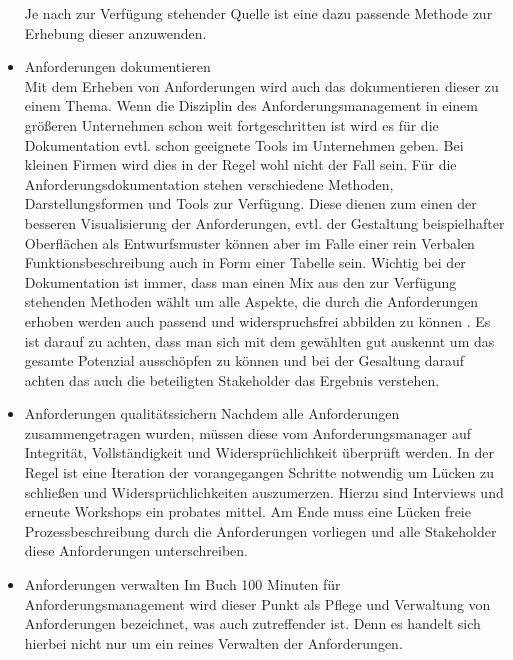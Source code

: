 \begin{itemize}
		Je nach zur Verfügung stehender Quelle ist eine dazu passende Methode zur Erhebung 
		dieser anzuwenden.
		
\item Anforderungen dokumentieren\\
		Mit dem Erheben von Anforderungen wird auch das dokumentieren dieser zu einem Thema. 
		Wenn die Disziplin des Anforderungsmanagement in einem größeren Unternehmen schon weit
		fortgeschritten ist wird es für die Dokumentation evtl. schon geeignete Tools im 
		Unternehmen geben. Bei kleinen Firmen wird dies in der Regel wohl nicht der Fall sein.
		Für die Anforderungsdokumentation stehen verschiedene Methoden, Darstellungsformen und 
		Tools zur Verfügung. Diese dienen zum einen der besseren Visualisierung der 
		Anforderungen, evtl. der Gestaltung beispielhafter Oberflächen als Entwurfsmuster 
		können aber im Falle einer rein Verbalen Funktionsbeschreibung auch in Form einer 
		Tabelle sein. Wichtig bei der Dokumentation ist immer, dass man einen Mix aus den zur 
		Verfügung stehenden Methoden wählt um alle Aspekte, die durch die Anforderungen erhoben 
		werden auch passend und widerspruchsfrei abbilden zu können
		\autocite[93-137]{AMin.sieben.T}. Es ist darauf zu achten, dass man sich mit dem gewählten 
		gut auskennt um das gesamte Potenzial ausschöpfen zu können und bei der Gesaltung darauf 
		achten das auch die beteiligten Stakeholder das Ergebnis verstehen.
		
		
\item Anforderungen qualitätssichern
		Nachdem alle Anforderungen zusammengetragen wurden, müssen diese vom Anforderungsmanager 
		auf Integrität, Vollständigkeit und Widersprüchlichkeit überprüft werden. In der Regel ist 
		eine Iteration der vorangegangen Schritte notwendig um Lücken zu schließen und 
		Widersprüchlichkeiten auszumerzen. Hierzu sind Interviews und erneute Workshops ein 		
		probates mittel. Am Ende muss eine Lücken freie Prozessbeschreibung durch die Anforderungen vorliegen
		und alle Stakeholder diese Anforderungen unterschreiben.
	
\item Anforderungen verwalten
		Im Buch 100 Minuten für Anforderungsmanagement\autocite[103]{100minAM} wird dieser Punkt als
		Pflege und Verwaltung von Anforderungen bezeichnet, was auch zutreffender ist. Denn es
		handelt sich hierbei nicht nur um ein reines Verwalten der Anforderungen. 
			

\end{itemize}
